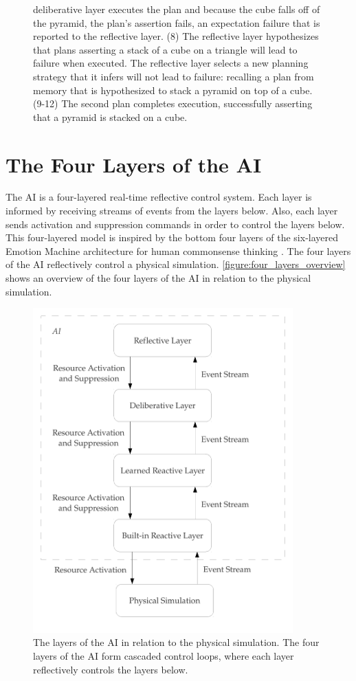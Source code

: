 \begin{figure}
{  deliberative layer executes the plan and because the cube falls off
  of the pyramid, the plan's assertion fails, an expectation failure
  that is reported to the reflective layer.  (8) The reflective layer
  hypothesizes that plans asserting a stack of a cube on a triangle
  will lead to failure when executed.  The reflective layer selects a
  new planning strategy that it infers will not lead to failure:
  recalling a plan from memory that is hypothesized to stack a pyramid
  on top of a cube.  (9-12) The second plan completes execution,
  successfully asserting that a pyramid is stacked on a cube.}
\label{figure:implemented_example_learning_storyboard}
\end{figure}

\section{The Four Layers of the AI}

The AI is a four-layered real-time reflective control system.  Each
layer is informed by receiving streams of events from the layers
below.  Also, each layer sends activation and suppression commands in
order to control the layers below.  This four-layered model is
inspired by the bottom four layers of the six-layered Emotion Machine
architecture for human commonsense thinking \cite[]{minsky:2006}.  The
four layers of the AI reflectively control a physical simulation.
{\mbox{\autoref{figure:four_layers_overview}}} shows an overview of
the four layers of the AI in relation to the physical simulation.
\begin{figure}
\begin{center}
\includegraphics[width=10cm]{gfx/four_layers_overview}
\end{center}
\caption[The four layers of the AI in relation to the physical
  simulation.]{The layers of the AI in relation to the physical
  simulation.  The four layers of the AI form cascaded control loops,
  where each layer reflectively controls the layers below.}
\label{figure:four_layers_overview}
\end{figure}

